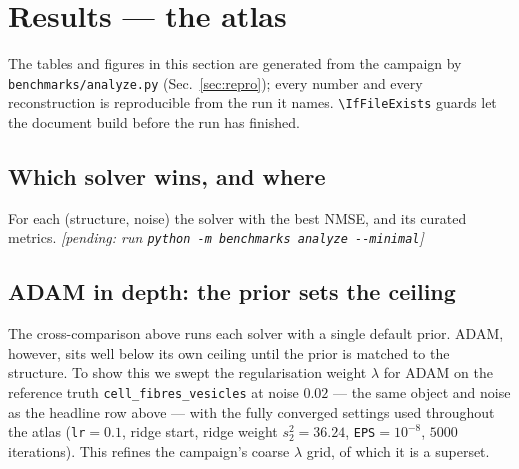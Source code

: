 \section{Results --- the atlas}
\label{sec:results}

The tables and figures in this section are generated from the campaign by
\texttt{benchmarks/analyze.py} (Sec.~\ref{sec:repro}); every number and every reconstruction is
reproducible from the run it names. \texttt{\textbackslash IfFileExists} guards let the document
build before the run has finished.

\subsection{Which solver wins, and where}
For each (structure, noise) the solver with the best NMSE, and its curated metrics.
%
  {\emph{[pending: run \texttt{python -m benchmarks analyze -{}-minimal}]}}

\subsection{ADAM in depth: the prior sets the ceiling}
\label{sec:adam-depth}
The cross-comparison above runs each solver with a single default prior. ADAM, however, sits
well below its own ceiling until the prior is matched to the structure. To show this we swept the
regularisation weight $\lambda$ for ADAM on the reference truth \texttt{cell\_fibres\_vesicles}
at noise $0.02$ --- the same object and noise as the headline row above --- with the fully
converged settings used throughout the atlas (\texttt{lr}$=0.1$, ridge start, ridge weight
$s_2^2 = 36.24$, \texttt{EPS}$=10^{-8}$, $5000$ iterations). This refines the campaign's coarse
$\lambda$ grid, of which it is a superset.

